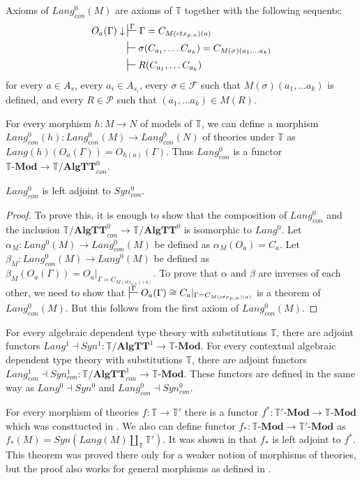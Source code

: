 \documentclass[reqno]{amsart}
\theoremstyle{definition}
\theoremstyle{remark}
\newcommand{\cat}[1]{\mathbf{#1}}
\newcommand{\Mod}[1]{#1\text{-}\cat{Mod}}
\newcommand{\algtt}{\cat{AlgTT}}
\numberwithin{figure}{section}
\begin{document}
Axioms of $Lang^0_{con}(M)$ are axioms of $\mathbb{T}$ together with the following sequents:
\begin{align*}
O_a(\Gamma) \downarrow & \sststile{}{\Gamma} \Gamma = C_{M(ctx_{p,n})(a)}\\
& \sststile{}{} \sigma(C_{a_1}, \ldots C_{a_k}) = C_{M(\sigma)(a_1, \ldots a_k)} \\
& \sststile{}{} R(C_{a_1}, \ldots C_{a_k})
\end{align*}
for every $a \in A_s$, every $a_i \in A_{s_i}$,
every $\sigma \in \mathcal{F}$ such that $M(\sigma)(a_1, \ldots a_k)$ is defined,
and every $R \in \mathcal{P}$ such that $(a_1, \ldots a_k) \in M(R)$.

For every morphism $h : M \to N$ of models of $\mathbb{T}$, we can define a morphism $Lang^0_{con}(h) : Lang^0_{con}(M) \to Lang^0_{con}(N)$ of theories under $\mathbb{T}$ as $Lang(h)(O_a(\Gamma)) = O_{h(a)}(\Gamma)$.
Thus $Lang^0_{con}$ is a functor $\Mod{\mathbb{T}} \to \mathbb{T}/\algtt^0_{con}$.

\begin{prop}
$Lang^0_{con}$ is left adjoint to $Syn^0_{con}$.
\end{prop}
\begin{proof}
To prove this, it is enough to show that the composition of $Lang^0_{con}$ and the inclusion $\mathbb{T}/\algtt^0_{con} \to \mathbb{T}/\algtt^0$ is isomorphic to $Lang^0$.
Let $\alpha_M : Lang^0(M) \to Lang^0_{con}(M)$ be defined as $\alpha_M(O_a) = C_a$.
Let $\beta_M : Lang^0_{con}(M) \to Lang^0(M)$ be defined as $\beta_M(O_a(\Gamma)) = O_a|_{\Gamma = C_{M(ctx_{p,n})(a)}}$.
To prove that $\alpha$ and $\beta$ are inverses of each other, we need to show that $\sststile{}{\Gamma} O_a(\Gamma) \cong C_a|_{\Gamma = C_{M(ctx_{p,n})(a)}}$ is a theorem of $Lang^0_{con}(M)$.
But this follows from the first axiom of $Lang^0_{con}(M)$.
\end{proof}

For every algebraic dependent type theory with substitutions $\mathbb{T}$, there are adjoint functors $Lang^1 \dashv Syn^1 : \mathbb{T}/\algtt^1 \to \Mod{\mathbb{T}}$.
For every contextual algebraic dependent type theory with substitutions $\mathbb{T}$, there are adjoint functors $Lang^1_{con} \dashv Syn^1_{con} : \mathbb{T}/\algtt^1_{con} \to \Mod{\mathbb{T}}$.
These functors are defined in the same way as $Lang^0 \dashv Syn^0$ and $Lang^0_{con} \dashv Syn^0_{con}$.

For every morphism of theories $f : \mathbb{T} \to \mathbb{T}'$ there is a functor $f^* : \Mod{\mathbb{T}'} \to \Mod{\mathbb{T}}$ which was consttucted in \cite{alg-tt}.
We also can define functor $f_* : \Mod{\mathbb{T}} \to \Mod{\mathbb{T}'}$ as $f_*(M) = Syn(Lang(M) \amalg_{\mathbb{T}} \mathbb{T}')$.
It was shown in \cite{PHL} that $f_*$ is left adjoint to $f^*$.
This theorem was proved there only for a weaker notion of morphisms of theories, but the proof also works for general morphisms as defined in \cite{alg-tt}.
\end{document}
